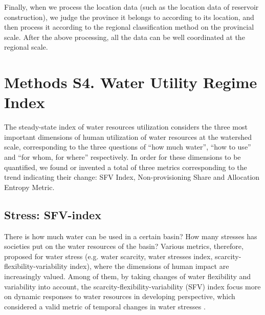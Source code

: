 \documentclass[9pt,twoside,lineno]{pnas-new}
\begin{document}
Finally, when we process the location data (such as the location data of reservoir construction), we judge the province it belongs to according to its location, and then process it according to the regional classification method on the provincial scale. After the above processing, all the data can be well coordinated at the regional scale.

\newpage
\section*{Methods S4. Water Utility Regime Index}
The steady-state index of water resources utilization considers the three most important dimensions of human utilization of water resources at the watershed scale, corresponding to the three questions of ``how much water'', ``how to use'' and ``for whom, for where'' respectively. 
In order for these dimensions to be quantified, we found or invented a total of three metrics corresponding to the trend indicating their change: SFV Index, Non-provisioning Share and Allocation Entropy Metric.

\subsection*{Stress: SFV-index}
	There is how much water can be used in a certain basin? How many stresses has societies put on the water resources of the basin? Various metrics, therefore, proposed for water stress (e.g. water scarcity, water stresses index, scarcity-flexibility-variability index), where the dimensions of human impact are increasingly valued.
    Among of them, by taking changes of water flexibility and variability into account,	the scarcity-flexibility-variability (SFV) index focus more on dynamic responses to water resources in developing perspective, which considered a valid metric of temporal changes in water stresses \cite{qinFlexibilityIntensityGlobal2019}.
    
\end{document}
